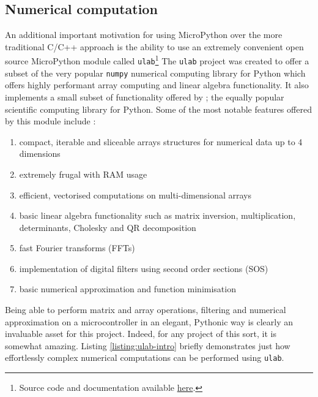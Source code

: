 \subsection{Numerical computation}
An additional important motivation for using MicroPython over the more traditional C/C++ approach is the ability to use an extremely convenient open source MicroPython module called \texttt{ulab}\footnote{Source code and documentation available \href{https://github.com/v923z/micropython-ulab}{here}.} The \texttt{ulab} project was created to offer a subset of the very popular \texttt{numpy} numerical computing library for Python which offers highly performant array computing and linear algebra functionality. It also implements a small subset of functionality offered by ; the equally popular scientific computing library for Python. Some of the most notable features offered by this module include \cite{ulab}:
\begin{enumerate}
    \item compact, iterable and sliceable arrays structures for numerical data up to 4 dimensions
    \item extremely frugal with RAM usage
    \item efficient, vectorised computations on multi-dimensional arrays
    \item basic linear algebra functionality such as matrix inversion, multiplication, determinants, Cholesky and QR decomposition
    \item fast Fourier transforms (FFTs)
    \item implementation of digital filters using second order sections (SOS)
    \item basic numerical approximation and function minimisation
\end{enumerate}
Being able to perform matrix and array operations, filtering and numerical approximation on a microcontroller in an elegant, Pythonic way is clearly an invaluable asset for this project. Indeed, for any project of this sort, it is somewhat amazing. Listing \ref{listing:ulab-intro} briefly demonstrates just how effortlessly complex numerical computations can be performed using \texttt{ulab}.

